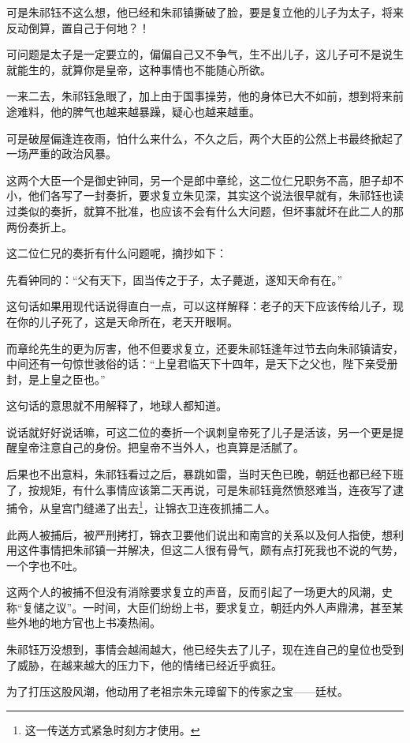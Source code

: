 \begin{multicols}{\theparacolNo}
可是朱祁钰不这么想，他已经和朱祁镇撕破了脸，要是复立他的儿子为太子，将来反动倒算，置自己于何地？！

可问题是太子是一定要立的，偏偏自己又不争气，生不出儿子，这儿子可不是说生就能生的，就算你是皇帝，这种事情也不能随心所欲。

一来二去，朱祁钰急眼了，加上由于国事操劳，他的身体已大不如前，想到将来前途难料，他的脾气也越来越暴躁，疑心也越来越重。

可是破屋偏逢连夜雨，怕什么来什么，不久之后，两个大臣的公然上书最终掀起了一场严重的政治风暴。

这两个大臣一个是御史钟同，另一个是郎中章纶，这二位仁兄职务不高，胆子却不小，他们各写了一封奏折，要求复立朱见深，其实这个说法很早就有，朱祁钰也读过类似的奏折，就算不批准，也应该不会有什么大问题，但坏事就坏在此二人的那两份奏折上。

这二位仁兄的奏折有什么问题呢，摘抄如下：

先看钟同的：“父有天下，固当传之于子，太子薨逝，遂知天命有在。”

这句话如果用现代话说得直白一点，可以这样解释：老子的天下应该传给儿子，现在你的儿子死了，这是天命所在，老天开眼啊。

而章纶先生的更为厉害，他不但要求复立，还要朱祁钰逢年过节去向朱祁镇请安，中间还有一句惊世骇俗的话：“上皇君临天下十四年，是天下之父也，陛下亲受册封，是上皇之臣也。”

这句话的意思就不用解释了，地球人都知道。

说话就好好说话嘛，可这二位的奏折一个讽刺皇帝死了儿子是活该，另一个更是提醒皇帝注意自己的身份。把皇帝不当外人，也真算是活腻了。

后果也不出意料，朱祁钰看过之后，暴跳如雷，当时天色已晚，朝廷也都已经下班了，按规矩，有什么事情应该第二天再说，可是朱祁钰竟然愤怒难当，连夜写了逮捕令，从皇宫门缝递了出去\footnote{这一传送方式紧急时刻方才使用。}，让锦衣卫连夜抓捕二人。

此两人被捕后，被严刑拷打，锦衣卫要他们说出和南宫的关系以及何人指使，想利用这件事情把朱祁镇一并解决，但这二人很有骨气，颇有点打死我也不说的气势，一个字也不吐。

这两个人的被捕不但没有消除要求复立的声音，反而引起了一场更大的风潮，史称“复储之议”。一时间，大臣们纷纷上书，要求复立，朝廷内外人声鼎沸，甚至某些外地的地方官也上书凑热闹。

朱祁钰万没想到，事情会越闹越大，他已经失去了儿子，现在连自己的皇位也受到了威胁，在越来越大的压力下，他的情绪已经近乎疯狂。

为了打压这股风潮，他动用了老祖宗朱元璋留下的传家之宝——廷杖。


\end{multicols}
